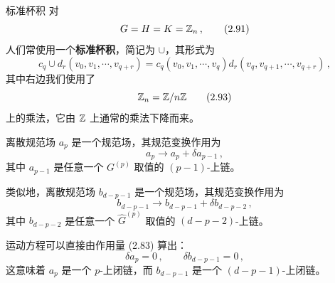 
\begin{notebox}{标准杯积}
对
\begin{equation}
  G = H = K = \mathbb{Z}_n\,, \tag{2.91}
\end{equation}
人们常使用一个\textbf{标准杯积}，简记为 $\cup$，其形式为
\begin{equation}
  c_q\cup d_r(v_0,v_1,\cdots,v_{q+r}) = c_q(v_0,v_1,\cdots,v_q)d_r(v_q,v_{q+1},\cdots,v_{q+r})\,, \tag{2.92}
\end{equation}
其中右边我们使用了
\begin{equation}
  \mathbb{Z}_n = \mathbb{Z}/n\mathbb{Z} \tag{2.93}
\end{equation}
上的乘法，它由 $\mathbb{Z}$ 上通常的乘法下降而来。
\end{notebox}


 离散规范场 $a_p$ 是一个规范场，其规范变换作用为
\begin{equation}
  a_p\to a_p+\delta a_{p-1}\,, \tag{2.94}
\end{equation}
其中 $a_{p-1}$ 是任意一个 $G^{(p)}$ 取值的 $(p-1)$-上链。

类似地，离散规范场 $b_{d-p-1}$ 是一个规范场，其规范变换作用为
\begin{equation}
  b_{d-p-1}\to b_{d-p-1}+\delta b_{d-p-2}\,, \tag{2.95}
\end{equation}
其中 $b_{d-p-2}$ 是任意一个 $\widehat{G}^{(p)}$ 取值的 $(d-p-2)$-上链。

 运动方程可以直接由作用量 (2.83) 算出：
\begin{equation}
  \delta a_p = 0\,,\qquad \delta b_{d-p-1} = 0\,, \tag{2.96}
\end{equation}
这意味着 $a_p$ 是一个 $p$-上闭链，而 $b_{d-p-1}$ 是一个 $(d-p-1)$-上闭链。

